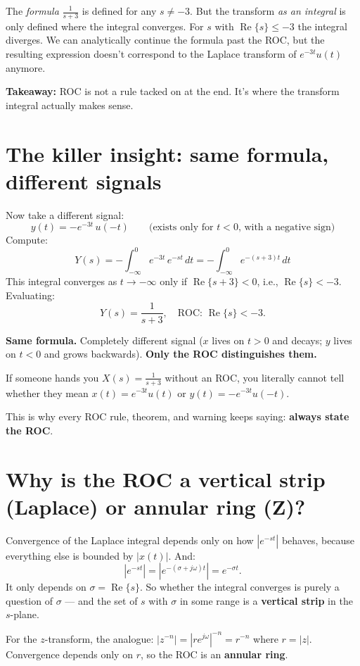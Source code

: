 \documentclass[11pt]{article}
\begin{document}
The \emph{formula} $\tfrac{1}{s+3}$ is defined for any $s \ne -3$. But the transform \emph{as an integral} is only defined where the integral converges. For $s$ with $\operatorname{Re}\{s\} \le -3$ the integral diverges. We can analytically continue the formula past the ROC, but the resulting expression doesn't correspond to the Laplace transform of $e^{-3t}u(t)$ anymore.

\textbf{Takeaway:} ROC is not a rule tacked on at the end. It's where the transform integral actually makes sense.

\section{The killer insight: same formula, different signals}

Now take a different signal:
\[
y(t) = -e^{-3t}\, u(-t) \qquad \text{(exists only for } t<0 \text{, with a negative sign)}
\]
Compute:
\[
Y(s) = -\int_{-\infty}^{0} e^{-3t}\, e^{-st}\, dt = -\int_{-\infty}^{0} e^{-(s+3)t}\, dt
\]
This integral converges as $t \to -\infty$ only if $\operatorname{Re}\{s+3\} < 0$, i.e., $\operatorname{Re}\{s\} < -3$. Evaluating:
\[
Y(s) = \frac{1}{s+3}, \quad \text{ROC: } \operatorname{Re}\{s\} < -3.
\]

\textbf{Same formula.} Completely different signal ($x$ lives on $t>0$ and decays; $y$ lives on $t<0$ and grows backwards). \textbf{Only the ROC distinguishes them.}

If someone hands you $X(s) = \tfrac{1}{s+3}$ without an ROC, you literally cannot tell whether they mean $x(t) = e^{-3t}u(t)$ or $y(t) = -e^{-3t}u(-t)$.

This is why every ROC rule, theorem, and warning keeps saying: \textbf{always state the ROC}.

\section{Why is the ROC a vertical strip (Laplace) or annular ring (Z)?}

Convergence of the Laplace integral depends only on how $|e^{-st}|$ behaves, because everything else is bounded by $|x(t)|$. And:
\[
|e^{-st}| = |e^{-(\sigma + j\omega)t}| = e^{-\sigma t}.
\]
It only depends on $\sigma = \operatorname{Re}\{s\}$. So whether the integral converges is purely a question of $\sigma$ --- and the set of $s$ with $\sigma$ in some range is a \textbf{vertical strip} in the $s$-plane.

For the $z$-transform, the analogue: $|z^{-n}| = |re^{j\omega}|^{-n} = r^{-n}$ where $r = |z|$. Convergence depends only on $r$, so the ROC is an \textbf{annular ring}.
\end{document}
